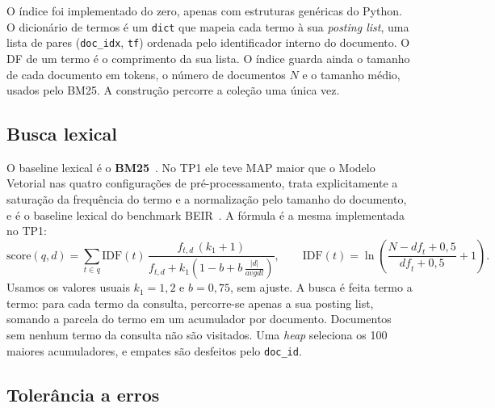 \documentclass[11pt,a4paper]{article}
\newcommand{\cod}[1]{\texttt{#1}}
\begin{document}
O índice foi implementado do zero, apenas com estruturas genéricas do Python. O dicionário de termos é um \cod{dict} que mapeia cada termo à sua \emph{posting list}, uma lista de pares (\cod{doc\_idx}, \cod{tf}) ordenada pelo identificador interno do documento. O DF de um termo é o comprimento da sua lista. O índice guarda ainda o tamanho de cada documento em tokens, o número de documentos $N$ e o tamanho médio, usados pelo BM25. A construção percorre a coleção uma única vez.

\subsection{Busca lexical}

O baseline lexical é o \textbf{BM25}~\cite{robertson2009}. No TP1 ele teve MAP maior que o Modelo Vetorial nas quatro configurações de pré-processamento, trata explicitamente a saturação da frequência do termo e a normalização pelo tamanho do documento, e é o baseline lexical do benchmark BEIR~\cite{thakur2021}. A fórmula é a mesma implementada no TP1:
\begin{equation*}
\mathrm{score}(q,d)=\sum_{t\in q}\mathrm{IDF}(t)\,\frac{f_{t,d}\,(k_1+1)}{f_{t,d}+k_1\left(1-b+b\,\frac{|d|}{\mathit{avgdl}}\right)},
\qquad
\mathrm{IDF}(t)=\ln\!\left(\frac{N-\mathit{df}_t+0{,}5}{\mathit{df}_t+0{,}5}+1\right).
\end{equation*}
Usamos os valores usuais $k_1=1{,}2$ e $b=0{,}75$, sem ajuste. A busca é feita termo a termo: para cada termo da consulta, percorre-se apenas a sua posting list, somando a parcela do termo em um acumulador por documento. Documentos sem nenhum termo da consulta não são visitados. Uma \emph{heap} seleciona os 100 maiores acumuladores, e empates são desfeitos pelo \cod{doc\_id}.

\subsection{Tolerância a erros}
\end{document}

